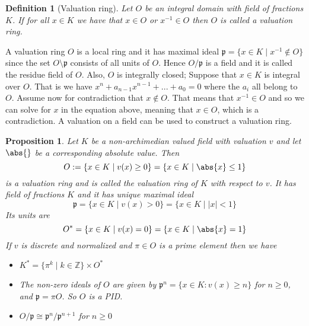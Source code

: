 \documentclass{article}
\newtheorem{definition}{Definition}[section]
\newtheorem{proposition}{Proposition}[section]
\newcommand{\mfrak}[1]{\mathfrak{#1}}
\newcommand{\mbb}[1]{\mathbb{#1}}
\begin{document}
\begin{definition}[Valuation ring]
    Let $O$ be an integral domain with field of fractions $K$. If for all $x \in K$ we have that $x \in O$ or $x^{-1} \in O$ then $O$ is called a valuation ring.
\end{definition}

A valuation ring $O$ is a local ring and it has maximal ideal $\mfrak p = \{x \in K \mid x^{-1} \notin O \}$ since the set $O \setminus \mfrak p$ consists of all units of $O$. Hence $O / \mfrak p$ is a field and it is called the residue field of $O$. Also, $O$ is integrally closed; Suppose that $x \in K$ is integral over $O$. That is we have $x^n + a_{n-1}x^{n-1} + ... + a_0 = 0$ where the $a_i$ all belong to $O$. Assume now for contradiction that $x \notin O$. That means that $x^{-1} \in O$ and so we can solve for $x$ in the equation above, meaning that $x \in O$, which is a contradiction. A valuation on a field can be used to construct a valuation ring.
\begin{proposition}\label{prop: Valuation ring of a field}
    Let $K$ be a non-archimedian valued field with valuation $v$ and let $\abs{}$ be a corresponding absolute value. Then
    $$O := \{x \in K \mid  v(x) \geq 0 \} = \{x \in K \mid  \abs{x} \leq 1 \}$$
    is a valuation ring and is called the valuation ring of $K$ with respect to $v$. It has field of fractions $K$ and it has unique maximal ideal
    $$\mfrak p = \{x \in K \mid v(x) > 0 \} = \{x \in K \mid |x| < 1 \}$$
    Its units are
    $$O^* = \{x \in K \mid v(x) = 0\} = \{x \in K \mid \abs{x} = 1 \}$$
    If $v$ is discrete and normalized and $\pi \in O$ is a prime element then we have 
    \begin{itemize}
        \item $K^* = \{\pi^k \mid k \in \mbb Z \} \times O^*$
        \item The non-zero ideals of $O$ are given by
        $\mfrak p^n = \{x \in K : v(x) \geq n \}$
        for $n \geq 0$, and $\mfrak p = \pi O$. So $O$ is a PID.
        \item $O / \mfrak p \cong \mfrak p^n / \mfrak p^{n+1}$ for $n \geq 0$
    \end{itemize}
\end{proposition}
\end{document}
